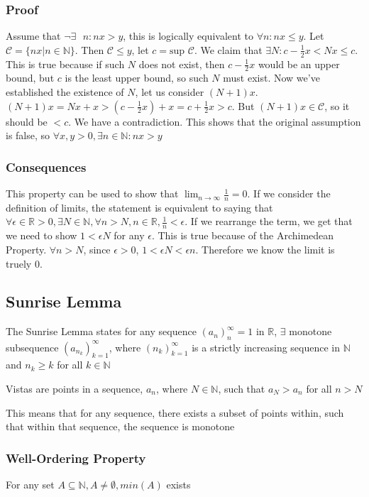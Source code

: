 \documentclass[11 pt, twoside]{article}
\begin{document}
\subsubsection{Proof}
Assume that $\neg \exists\text{ } n:nx > y$, this is logically equivalent to
$\forall n: nx \leq y$. Let $\mathcal{C} = \{nx | n \in \mathbb{N}\}$. Then
$\mathcal{C} \leq y$, let $c = \text{sup } \mathcal{C}$.
We claim that $\exists N: c-\frac{1}{2}x < Nx \leq c$. This is true because if
such $N$ does not exist, then $c - \frac{1}{2}x$ would be an upper bound, but
$c$ is the least upper bound, so such $N$ must exist.
Now we've established the existence of $N$, let us consider $(N + 1)x$. $(N +
1)x = Nx + x > (c - \frac{1}{2}x) + x = c + \frac{1}{2}x > c$. But $(N + 1)x \in
\mathcal{C}$, so it should be $< c$. We have a contradiction. This shows that
the original assumption is false, so $\forall x, y > 0, \exists n \in
\mathbb{N}: nx > y$

\subsubsection{Consequences}
This property can be used to show that $\lim_{n\to\infty} \frac{1}{n} = 0$.
If we consider the definition of limits, the statement is equivalent to saying
that $\forall \epsilon \in \mathbb{R} > 0, \exists N \in \mathbb{N},
\forall n > N, n \in \mathbb{R}, \frac{1}{n} < \epsilon$.
If we rearrange the term, we get that we need to show $1 < \epsilon N$ for any
$\epsilon$. This is true because of the Archimedean Property. $\forall n > N$,
since $\epsilon > 0$, $1 < \epsilon N < \epsilon n$. Therefore we know the limit
is truely 0.

\subsection{Sunrise Lemma}

The Sunrise Lemma states for any sequence $(a_n)^\infty_n=1$ in $\mathbb{R}$, $\exists$ monotone subsequence $(a_{n_k})^\infty_{k=1}$, where $(n_k)^\infty_{k=1}$ is a strictly increasing sequence in $\mathbb{N}$ and $n_k \geq k$ for all $k \in \mathbb{N}$

Vistas are points in a sequence, $a_n$, where  $N \in \mathbb{N}$, such that $a_N > a_n$ for all $n > N$

This means that for any sequence, there exists a subset of points within, such that within that sequence, the sequence is monotone

\subsubsection{Well-Ordering Property}
For any set $A \subseteq \mathbb{N}, A \neq \emptyset, min(A)$ exists
\end{document}
